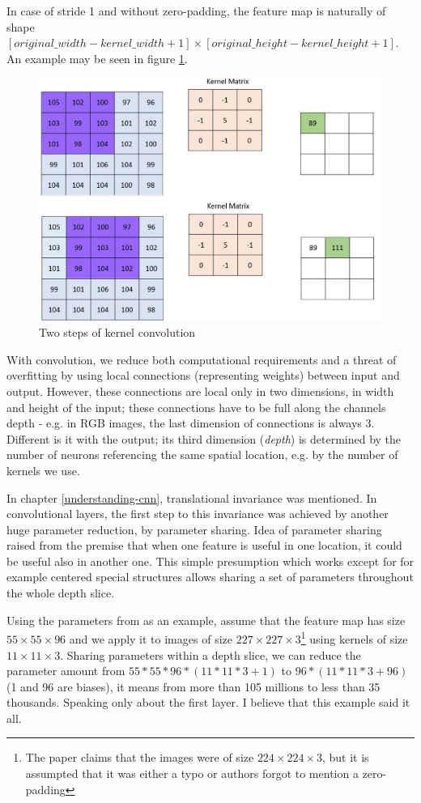 In case of stride 1 and without zero-padding, the feature map is naturally of 
shape $[original\_width - kernel\_width + 1] \times [original\_height - 
kernel\_height + 1]$. An example may be seen in figure \ref{fig:conv}. 

\begin{figure}[H]
   \centering
	\includegraphics[width=.4\linewidth]{./pictures/conv.jpg}
	\caption[Kernel convolution]{Two steps of kernel convolution}
      \label{fig:conv}
\end{figure}

With convolution, we reduce both computational requirements and a threat of 
overfitting by using local connections (representing weights) between input and 
output. However, these connections are local only in two dimensions, in width 
and height of the input; these connections have to be full along the channels 
depth - e.g. in RGB images, the last dimension of connections is always 3. 
Different is it with the output; its third dimension (\textit{depth}) is 
determined by the number of neurons referencing the same spatial location, e.g. 
by the number of kernels we use. 

In chapter \ref{understanding-cnn}, translational invariance was mentioned. In 
convolutional layers, the first step to this invariance was achieved by another 
huge parameter reduction, by parameter sharing. Idea of parameter sharing raised 
from the premise that when one feature is useful in one location, it could be 
useful also in another one. This simple presumption which works except for for 
example centered special structures allows sharing a set of parameters 
throughout the whole depth slice. 

Using the parameters from \cite{cnn-classification} as an example, assume that 
the feature map has size $55 \times 55 \times 96$ and we apply it to images of 
size $227 \times 227 \times 3$\footnote{The paper claims that the images were of 
size $224 \times 224 \times 3$, but it is assumpted that it was either a typo or 
authors forgot to mention a zero-padding} using kernels of size $11 \times 11 
\times 3$. Sharing parameters within a depth slice, we can reduce the parameter 
amount from $55 * 55 * 96 * (11 * 11 * 3 + 1)$ to $96 * (11 * 11 * 3 + 96)$ (1 
and 96 are biases), it means from more than 105 millions to less than 35 
thousands. Speaking only about the first layer. I believe that this example said 
it all. 

